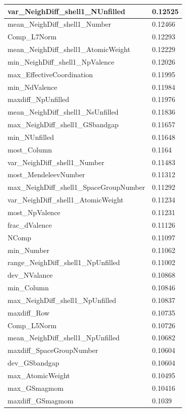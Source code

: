 \begin{longtable}{|l|l|}
var\_NeighDiff\_shell1\_NUnfilled & 0.12525 \\ \hline
mean\_NeighDiff\_shell1\_Number & 0.12466 \\ \hline
Comp\_L7Norm & 0.12293 \\ \hline
mean\_NeighDiff\_shell1\_AtomicWeight & 0.12229 \\ \hline
min\_NeighDiff\_shell1\_NpValence & 0.12026 \\ \hline
max\_EffectiveCoordination & 0.11995 \\ \hline
min\_NdValence & 0.11984 \\ \hline
maxdiff\_NpUnfilled & 0.11976 \\ \hline
mean\_NeighDiff\_shell1\_NsUnfilled & 0.11836 \\ \hline
max\_NeighDiff\_shell1\_GSbandgap & 0.11657 \\ \hline
min\_NUnfilled & 0.11648 \\ \hline
most\_Column & 0.1164 \\ \hline
var\_NeighDiff\_shell1\_Number & 0.11483 \\ \hline
most\_MendeleevNumber & 0.11312 \\ \hline
max\_NeighDiff\_shell1\_SpaceGroupNumber & 0.11292 \\ \hline
var\_NeighDiff\_shell1\_AtomicWeight & 0.11234 \\ \hline
most\_NpValence & 0.11231 \\ \hline
frac\_dValence & 0.11126 \\ \hline
NComp & 0.11097 \\ \hline
min\_Number & 0.11062 \\ \hline
range\_NeighDiff\_shell1\_NpUnfilled & 0.11002 \\ \hline
dev\_NValance & 0.10868 \\ \hline
min\_Column & 0.10846 \\ \hline
max\_NeighDiff\_shell1\_NpUnfilled & 0.10837 \\ \hline
maxdiff\_Row & 0.10735 \\ \hline
Comp\_L5Norm & 0.10726 \\ \hline
mean\_NeighDiff\_shell1\_NpUnfilled & 0.10682 \\ \hline
maxdiff\_SpaceGroupNumber & 0.10604 \\ \hline
dev\_GSbandgap & 0.10604 \\ \hline
max\_AtomicWeight & 0.10495 \\ \hline
max\_GSmagmom & 0.10416 \\ \hline
maxdiff\_GSmagmom & 0.1039 \\ \hline

\end{longtable}
